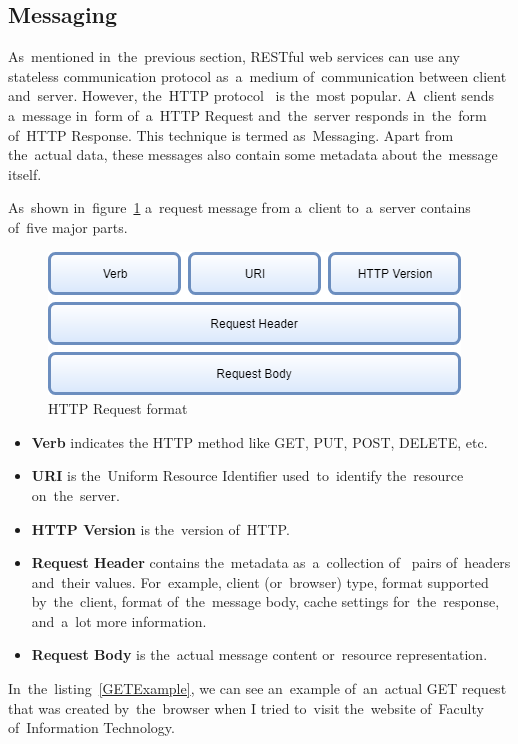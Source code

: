 \subsection{Messaging}
As~mentioned in~the~previous section, RESTful web services can use any stateless
communication protocol as~a~medium of~communication between client and~server.
However, the~HTTP protocol~\cite{HTTP} is the~most popular. A~client sends
a~message in~form of~a~HTTP Request and~the~server responds in~the~form of~HTTP Response. This
technique is termed as~Messaging. Apart from the~actual data, these messages
also contain some metadata about the~message itself.

As~shown in~figure~\ref{HTTPRequestFormat} a~request message from a~client
to~a~server contains of~five major parts.

\begin{figure}[!hbt]
	\centering
	\includegraphics[scale=0.65]{./obrazky-figures/html-request.png}
	\caption{HTTP Request format}
	\label{HTTPRequestFormat}
\end{figure}

\begin{itemize}
  \item \textbf{Verb} indicates the HTTP method like GET, PUT, POST, DELETE,
  etc.
  \item \textbf{URI} is the~Uniform Resource Identifier used~to~identify
  the~resource on~the~server.
  \item \textbf{HTTP Version} is the~version of~HTTP.
  \item \textbf{Request Header} contains the~metadata as~a~collection
  of~ pairs of~headers and~their values. For~example, client
  (or~browser) type, format supported by~the~client, format of~the~message body,
  cache settings for~the~response, and~a~lot more information.
  \item \textbf{Request Body} is the~actual message content or~resource
  representation.
\end{itemize}

In~the~listing~\ref{GETExample}, we can see an~example of~an~actual GET
request that was created by~the~browser when I tried to~visit the~website
of~Faculty of~Information Technology.

